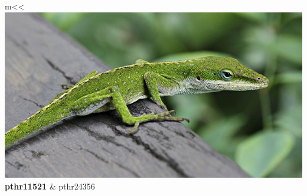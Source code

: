 \documentclass[aspectratio=169, 9pt, handout]{beamer}\usepackage[]{graphicx}\usepackage[]{color}
\begin{document}
\begin{frame}[t]
\begin{table}
\begin{tabular}{*{2}{m{\tmpwidth}<\centering}}
\includegraphics[width=1\linewidth]{Anole_Lizard.jpg} \linebreak \textbf{pthr11521} & %
   \linebreak pthr24356
\end{tabular}
\end{table}
\end{frame}
\end{document}
